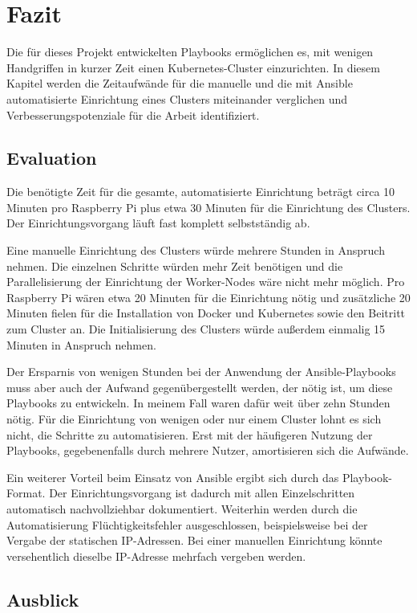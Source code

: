 \chapter{Fazit}\label{ch:fazit}

Die für dieses Projekt entwickelten Playbooks ermöglichen es, mit wenigen Handgriffen in kurzer Zeit einen Kubernetes-Cluster einzurichten.
In diesem Kapitel werden die Zeitaufwände für die manuelle und die mit Ansible automatisierte Einrichtung eines Clusters miteinander verglichen und Verbesserungspotenziale für die Arbeit identifiziert.

\section{Evaluation}

Die benötigte Zeit für die gesamte, automatisierte Einrichtung beträgt circa 10 Minuten pro Raspberry Pi plus etwa 30 Minuten für die Einrichtung des Clusters.
Der Einrichtungsvorgang läuft fast komplett selbstständig ab.

Eine manuelle Einrichtung des Clusters würde mehrere Stunden in Anspruch nehmen.
Die einzelnen Schritte würden mehr Zeit benötigen und die Parallelisierung der Einrichtung der Worker-Nodes wäre nicht mehr möglich.
Pro Raspberry Pi wären etwa 20 Minuten für die Einrichtung nötig und zusätzliche 20 Minuten fielen für die Installation von Docker und Kubernetes sowie den Beitritt zum Cluster an.
Die Initialisierung des Clusters würde außerdem einmalig 15 Minuten in Anspruch nehmen.

Der Ersparnis von wenigen Stunden bei der Anwendung der Ansible-Playbooks muss aber auch der Aufwand gegenübergestellt werden, der nötig ist, um diese Playbooks zu entwickeln.
In meinem Fall waren dafür weit über zehn Stunden nötig.
Für die Einrichtung von wenigen oder nur einem Cluster lohnt es sich nicht, die Schritte zu automatisieren.
Erst mit der häufigeren Nutzung der Playbooks, gegebenenfalls durch mehrere Nutzer, amortisieren sich die Aufwände.

Ein weiterer Vorteil beim Einsatz von Ansible ergibt sich durch das Playbook-Format.
Der Einrichtungsvorgang ist dadurch mit allen Einzelschritten automatisch nachvollziehbar dokumentiert.
Weiterhin werden durch die Automatisierung Flüchtigkeitsfehler ausgeschlossen, beispielsweise bei der Vergabe der statischen IP-Adressen.
Bei einer manuellen Einrichtung könnte versehentlich dieselbe IP-Adresse mehrfach vergeben werden.

\section{Ausblick}\label{sec:ausblick}

